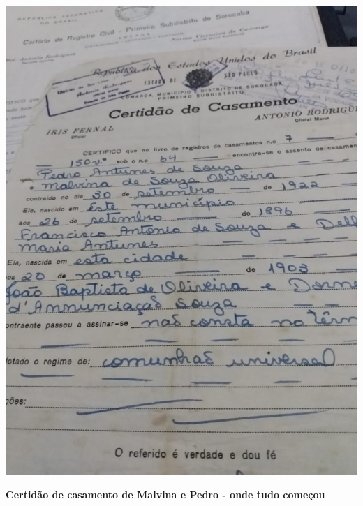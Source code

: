 \documentclass[12pt,brazil,]{book}
\begin{document}
\includegraphics{Imagens/CertidaoCasMalvinaPedro.jpeg}

\textbf{Certidão de casamento de Malvina e Pedro - onde tudo começou}
\end{document}
